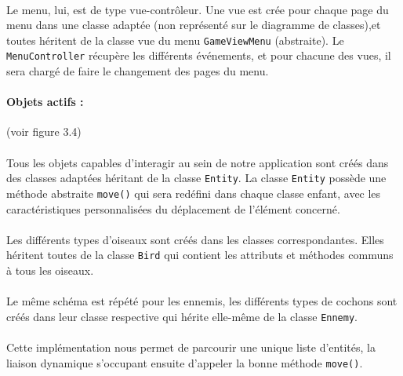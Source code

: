 \documentclass[a4paper,12pt]{report}
\begin{document}
\paragraph{}Le menu, lui, est de type vue-contrôleur. Une vue est crée pour chaque page du menu dans une classe adaptée (non représenté sur le diagramme de classes),et toutes héritent de la classe vue du menu \verb+GameViewMenu+ (abstraite). Le \verb+MenuController+ récupère les différents événements, et pour chacune des vues, il sera chargé de faire le changement des pages du menu.

\paragraph{Objets actifs :}(voir figure 3.4)

\paragraph{}Tous les objets capables d'interagir au sein de notre application sont créés dans des classes adaptées héritant de la classe \verb+Entity+. La classe \verb+Entity+ possède une méthode abstraite \verb+move()+ qui sera redéfini dans chaque classe enfant, avec les caractéristiques personnalisées du déplacement de l'élément concerné.

\paragraph{}Les différents types d'oiseaux sont créés dans les classes correspondantes. Elles héritent toutes de la classe \verb+Bird+ qui contient les attributs et méthodes communs à tous les oiseaux.

\paragraph{}Le même schéma est répété pour les ennemis, les différents types de cochons sont créés dans leur classe respective qui hérite elle-même de la classe \verb+Ennemy+.

\paragraph{}Cette implémentation nous permet de parcourir une unique liste d'entités, la liaison dynamique s'occupant ensuite d'appeler la bonne méthode \verb+move()+.
\end{document}
